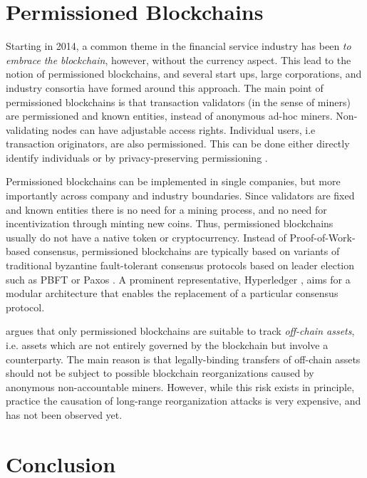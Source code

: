 \section{Permissioned Blockchains}

Starting in 2014, a common theme in the financial service industry has been \emph{to embrace the blockchain}, however, without the currency aspect. This lead to the notion of permissioned blockchains, and several start ups, large corporations, and industry consortia have formed around this approach. The main point of permissioned blockchains is that transaction validators (in the sense of miners) are permissioned and known entities, instead of anonymous ad-hoc miners. Non-validating nodes can have adjustable access rights. Individual users, i.e transaction originators, are also permissioned. This can be done either directly identify individuals or by privacy-preserving permissioning \parencite{hardjono2016chain,Hardjono:2016:CCC:2899007.2899012}.

Permissioned blockchains can be implemented in single companies, but more importantly across company and industry boundaries. Since validators are fixed and known entities there is no need for a mining process, and no need for incentivization through minting new coins. Thus, permissioned blockchains usually do not have a native token or cryptocurrency. Instead of Proof-of-Work-based consensus, permissioned blockchains are typically based on variants of traditional byzantine fault-tolerant consensus protocols based on leader election such as PBFT \parencite{castro1999practical} or Paxos \parencite{lamport2001paxos}. A prominent representative, Hyperledger \parencite{cachin2016architecture}, aims for a modular architecture that enables the replacement of a particular consensus protocol.

\cite{swanson2015consensus} argues that only permissioned blockchains are suitable to track \emph{off-chain assets}, i.e. assets which are not entirely governed by the blockchain but involve a counterparty. The main reason is that legally-binding transfers of off-chain assets should not be subject to possible blockchain reorganizations caused by anonymous non-accountable miners. However, while this risk exists in principle, practice the causation of long-range reorganization attacks is very expensive, and has not been observed yet.



\section{Conclusion}

